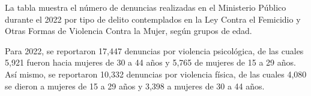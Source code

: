 La tabla muestra el número de denuncias realizadas en el Ministerio Público durante el 2022 por tipo de delito contemplados en la Ley Contra el Femicidio y Otras Formas de Violencia Contra la Mujer, según grupos de edad.

Para 2022, se reportaron 17,447 denuncias por violencia psicológica, de las cuales 5,921 fueron hacia mujeres de 30 a 44 años y 5,765 de mujeres de 15 a 29 años. Así mismo, se reportaron 10,332 denuncias por violencia física, de las cuales 4,080 se dieron a mujeres de 15 a 29 años y 3,398 a mujeres de 30 a 44 años. 